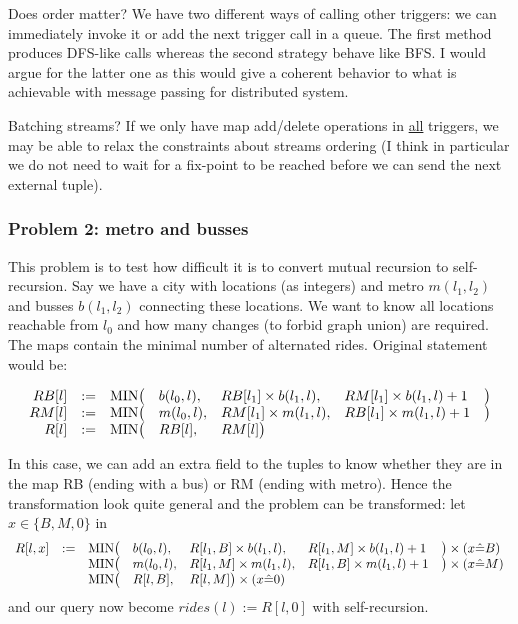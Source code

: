 \documentclass[10pt]{article}
\begin{document}
\item Does order matter? We have two different ways of calling other triggers: we can immediately invoke it or add the next trigger call in a queue. The first method produces DFS-like calls whereas the second strategy behave like BFS. I would argue for the latter one as this would give a coherent behavior to what is achievable with message passing for distributed system.
\item Batching streams? If we only have map add/delete operations in \underline{all} triggers, we may be able to relax the constraints about streams ordering (I think in particular we do not need to wait for a fix-point to be reached before we can send the next external tuple).
\ole


\subsubsection*{Problem 2: metro and busses}
This problem is to test how difficult it is to convert mutual recursion to self-recursion. Say we have a city with locations (as integers) and metro $m(l_1,l_2)$ and busses $b(l_1,l_2)$ connecting these locations. We want to know all locations reachable from $l_0$ and how many changes (to forbid graph union) are required. The maps contain the minimal number of alternated rides. Original statement would be:

\[\begin{array}{rclllll}
RB[l] &:=& {\rm MIN}\big(&b(l_0,l),&RB[l_1] \times b(l_1,l),&RM[l_1] \times b(l_1,l) +1&\big) \\
RM[l] &:=& {\rm MIN}\big(&m(l_0,l),&RM[l_1] \times m(l_1,l),&RB[l_1] \times m(l_1,l) +1&\big) \\
R[l] &:=& {\rm MIN}\big(&RB[l],&RM[l] \big)
\end{array}\]

In this case, we can add an extra field to the tuples to know whether they are in the map RB (ending with a bus) or RM (ending with metro). Hence the transformation look quite general and the problem can be transformed: let $x\in\{B, M, 0\}$ in
\[\begin{array}{rclllll}
R[l,x] &:=& {\rm MIN}\big(&b(l_0,l),&R[l_1,B] \times b(l_1,l),&R[l_1,M] \times b(l_1,l) +1&\big) \times(x\hat=B) \\
&& {\rm MIN}\big(&m(l_0,l),&R[l_1,M] \times m(l_1,l),&R[l_1,B] \times m(l_1,l) +1&\big) \times(x\hat=M) \\
&& {\rm MIN}\big(&R[l,B],&R[l,M] \big)\times(x\hat=0)
\end{array}\]
and our query now become $rides(l):=R[l,0]$ with self-recursion.
\end{document}
